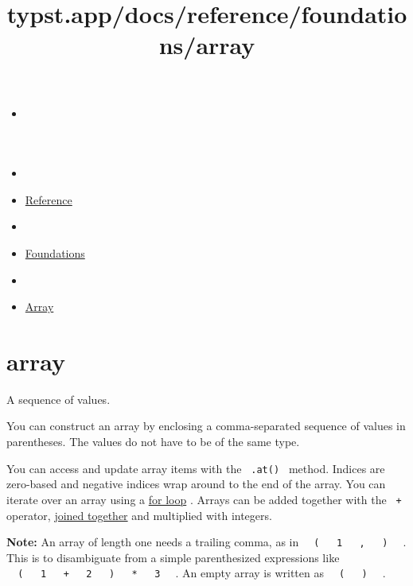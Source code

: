 \title{typst.app/docs/reference/foundations/array}

\begin{itemize}
\tightlist
\item
  \href{/docs}{}
\item
  
\item
  \href{/docs/reference/}{Reference}
\item
  
\item
  \href{/docs/reference/foundations/}{Foundations}
\item
  
\item
  \href{/docs/reference/foundations/array/}{Array}
\end{itemize}

\section{\texorpdfstring{{ array }}{ array }}\label{summary}

A sequence of values.

You can construct an array by enclosing a comma-separated sequence of
values in parentheses. The values do not have to be of the same type.

You can access and update array items with the \texttt{\ .at()\ }
method. Indices are zero-based and negative indices wrap around to the
end of the array. You can iterate over an array using a
\href{/docs/reference/scripting/\#loops}{for loop} . Arrays can be added
together with the \texttt{\ +\ } operator,
\href{/docs/reference/scripting/\#blocks}{joined together} and
multiplied with integers.

\textbf{Note:} An array of length one needs a trailing comma, as in
\texttt{\ }{\texttt{\ (\ }}\texttt{\ }{\texttt{\ 1\ }}\texttt{\ }{\texttt{\ ,\ }}\texttt{\ }{\texttt{\ )\ }}\texttt{\ }
. This is to disambiguate from a simple parenthesized expressions like
\texttt{\ }{\texttt{\ (\ }}\texttt{\ }{\texttt{\ 1\ }}\texttt{\ }{\texttt{\ +\ }}\texttt{\ }{\texttt{\ 2\ }}\texttt{\ }{\texttt{\ )\ }}\texttt{\ }{\texttt{\ *\ }}\texttt{\ }{\texttt{\ 3\ }}\texttt{\ }
. An empty array is written as
\texttt{\ }{\texttt{\ (\ }}\texttt{\ }{\texttt{\ )\ }}\texttt{\ } .

